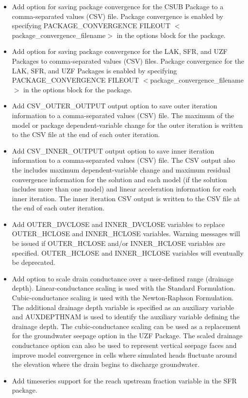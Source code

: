 \documentclass[11pt,twoside,twocolumn]{usgsreport}
\begin{document}
\begin{itemize}
\begin{itemize}
		\item Add option for saving package convergence for the CSUB Package to a comma-separated values (CSV) file. Package convergence is enabled by specifying PACKAGE\_CONVERGENCE FILEOUT $<$package\_convergence\_filename$>$ in the options block for the package.
		\item Add option for saving package convergence for the LAK, SFR, and UZF Packages to comma-separated values (CSV) files. Package convergence for the LAK, SFR, and UZF Packages is enabled by specifying PACKAGE\_CONVERGENCE FILEOUT $<$package\_convergence\_filename$>$ in the options block for the package.
		\item Add CSV\_OUTER\_OUTPUT output option to save outer iteration information to a comma-separated values (CSV) file. The maximum of the model or package dependent-variable change for the outer iteration is written to the CSV file at the end of each outer iteration. 
		\item Add CSV\_INNER\_OUTPUT output option to save inner iteration information to a comma-separated values (CSV) file. The CSV output also the includes maximum dependent-variable change and maximum residual convergence information for the solution and each model (if the solution includes more than one model) and linear acceleration information for each inner iteration. The inner iteration CSV output is written to the CSV file at the end of each outer iteration.
		\item Add OUTER\_DVCLOSE and INNER\_DVCLOSE variables to replace OUTER\_HCLOSE and INNER\_HCLOSE variables. Warning messages will be issued if OUTER\_HCLOSE and/or INNER\_HCLOSE variables are specified. OUTER\_HCLOSE and INNER\_HCLOSE variables will eventually be deprecated. 
		\item Add option to scale drain conductance over a user-defined range (drainage depth). Linear-conductance scaling is used with the Standard Formulation. Cubic-conductance scaling is used with the Newton-Raphson Formulation. The additional drainage depth variable is specified as an auxiliary variable and AUXDEPTHNAM is used to identify the auxiliary variable defining the drainage depth. The cubic-conductance scaling can be used as a replacement for the groundwater seepage option in the UZF Package. The scaled drainage conductance option can also be used to represent vertical seepage faces and improve model convergence in cells where simulated heads fluctuate around the elevation where the drain begins to discharge groundwater.
		\item Add timeseries support for the reach upstream fraction variable in the SFR package.

\end{itemize}
\end{itemize}
\end{document}
